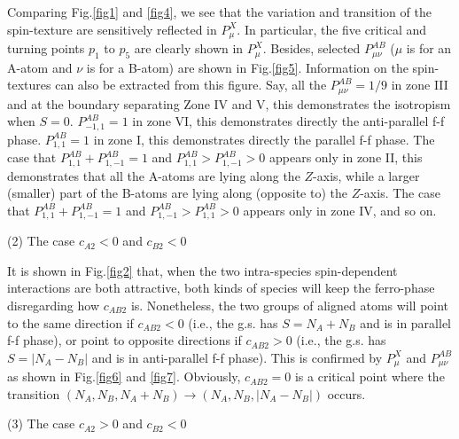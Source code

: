 \documentclass[10pt]{wlscirep}
\begin{document}
Comparing Fig.\ref{fig1} and \ref{fig4}, we see that the variation and
transition of the spin-texture are sensitively reflected in $P_{\mu }^{X}$.
In particular, the five critical and turning points $p_{1}$
to $p_{5}$ are clearly shown in $P_{\mu }^{X}$. Besides,
selected $P_{\mu \nu }^{AB}$ ($\mu $ is for an A-atom and $\nu $ is for a
B-atom) are shown in Fig.\ref{fig5}. Information on the spin-textures can
also be extracted from this figure. Say, all the $P_{\mu \nu }^{AB}=1/9$ in
zone III and at the boundary separating Zone IV and V, this demonstrates the
isotropism when $S=0$. $P_{-1,1}^{AB}=1$ in zone VI, this demonstrates
directly the anti-parallel f-f phase. $P_{1,1}^{AB}=1$ in zone I, this
demonstrates directly the parallel f-f phase. The case that $%
P_{1,1}^{AB}+P_{1,-1}^{AB}=1$ and $P_{1,1}^{AB}>P_{1,-1}^{AB}>0$ appears
only in zone II, this demonstrates that all the A-atoms are lying along the $%
Z$-axis, while a larger (smaller) part of the B-atoms are lying along
(opposite to) the $Z$-axis. The case that $P_{1,1}^{AB}+P_{1,-1}^{AB}=1$ and
$P_{1,-1}^{AB}>P_{1,1}^{AB}>0$ appears only in zone IV, and so on.

(2) The case $c_{A2}<0$ and $c_{B2}<0$

It is shown in Fig.\ref{fig2} that, when the two intra-species
spin-dependent interactions are both attractive, both kinds of species will
keep the ferro-phase disregarding how $c_{AB2}$ is. Nonetheless, the two
groups of aligned atoms will point to the same direction if $c_{AB2}<0$
(i.e., the g.s. has $S=N_{A}+N_{B}$ and is in parallel f-f phase), or point
to opposite directions if $c_{AB2}>0$ (i.e., the g.s. has $S=|N_{A}-N_{B}|$
and is in anti-parallel f-f phase). This is confirmed by $P_{\mu }^{X}$ and $%
P_{\mu \nu }^{AB}$ as shown in Fig.\ref{fig6} and \ref{fig7}. Obviously, $%
c_{AB2}=0$ is a critical point where the transition $%
(N_{A},N_{B},N_{A}+N_{B})\rightarrow (N_{A},N_{B},|N_{A}-N_{B}|)$ occurs.

(3) The case $c_{A2}>0$ and $c_{B2}<0$
\end{document}
